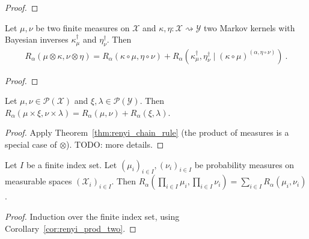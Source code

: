 \begin{proof}%
{}
\end{proof}


\begin{theorem}
  \label{thm:renyi_compProd_bayesInv}
  Let $\mu, \nu$ be two finite measures on $\mathcal X$ and $\kappa, \eta : \mathcal X \rightsquigarrow \mathcal Y$ two Markov kernels with Bayesian inverses $\kappa_\mu^\dagger$ and $\eta_\nu^\dagger$.
  Then 
  \begin{align*}
  R_\alpha(\mu \otimes \kappa, \nu \otimes \eta)
  = R_\alpha(\kappa \circ \mu, \eta \circ \nu) + R_\alpha(\kappa_\mu^\dagger, \eta_\nu^\dagger \mid (\kappa \circ \mu)^{(\alpha, \eta \circ \nu)})
  \: .
  \end{align*}
\end{theorem}

\begin{proof}%
{}

\end{proof}


\begin{corollary}
  \label{cor:renyi_prod_two}
  Let $\mu, \nu \in \mathcal P(\mathcal X)$ and $\xi, \lambda \in \mathcal P(\mathcal Y)$.
  Then $R_\alpha(\mu \times \xi, \nu \times \lambda) = R_\alpha(\mu, \nu) + R_\alpha(\xi, \lambda)$.
\end{corollary}

\begin{proof}%
{}
Apply Theorem~\ref{thm:renyi_chain_rule} (the product of measures is a special case of $\otimes$). TODO: more details.
\end{proof}


\begin{theorem}
  \label{thm:renyi_prod}
  Let $I$ be a finite index set. Let $(\mu_i)_{i \in I}, (\nu_i)_{i \in I}$ be probability measures on measurable spaces $(\mathcal X_i)_{i \in I}$.
  Then $R_\alpha (\prod_{i \in I} \mu_i, \prod_{i \in I} \nu_i) = \sum_{i \in I} R_\alpha(\mu_i, \nu_i)$.
\end{theorem}

\begin{proof}%
{}
Induction over the finite index set, using Corollary~\ref{cor:renyi_prod_two}.
\end{proof}


